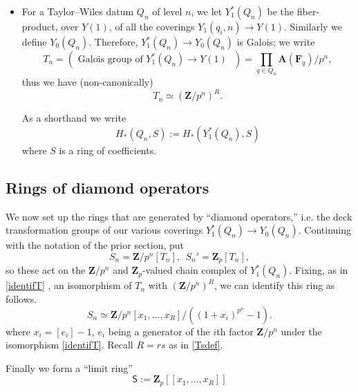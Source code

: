 \documentclass[10pt]{amsart}
\newcommand{\Z}{\mathbf{Z}}
\newcommand{\Sinf}{\mathsf{S}}
\theoremstyle{remark}
\begin{document}
\begin{itemize}
%

\item[-] For a Taylor--Wiles  datum $Q_n$ of level $n$, we  let    
 $Y_1^*(Q_n)$ be the fiber-product, over $Y(1)$, of all the coverings $Y_1(q_i,n) \rightarrow Y(1)$. 
 Similarly we define $Y_0(Q_n)$.  
Therefore, $Y_1^*(Q_n) \rightarrow Y_0(Q_n)$ is Galois;  
we write 
\begin{equation} \label{idontcare} T_n = \left(  \mbox{ Galois group of  $Y_1^*(Q_n) \rightarrow Y(1)$ }  \right) = \prod_{q \in Q_n} \mathbf{A}(\mathbf{F}_q)/p^n,\end{equation}
thus we have (non-canonically) 
\begin{equation} \label{identifT} T_n   \simeq (\Z/p^n)^R.\end{equation}


   As a shorthand we write
$$H_*(Q_n, S) := H_*(Y_1^*(Q_n), S)$$
where $S$ is a ring of coefficients.   



 \end{itemize}
 

\subsection{Rings of diamond operators} \label{sec:diamond} 
We now set up the rings that are generated by ``diamond operators,'' i.e. the deck transformation groups of our various coverings $Y_1^*(Q_n) \rightarrow Y_0(Q_n)$. 
Continuing  with the notation of the prior section, put    
\begin{equation} \label{sndef} S_n  = \Z/p^n[T_n], \ \ S_n' =  \Z_p [T_n], \end{equation}
so these act on  the $\Z/p^n$ and $\Z_p$-valued chain complex of $Y_1^*(Q_n)$. 
Fixing, as in \eqref{identifT} , an isomorphism of $T_n$ with $(\Z/p^n)^R$, we can identify this ring as follows.
\begin{equation} \label{explicit} S_n \simeq    \Z/p^n[x_1, \dots, x_R]/( (1+x_i)^{p^n}-1). \end{equation} 
where $x_i = [e_i]- 1$, $e_i$ being a generator of the $i$th factor $\Z/p^n$ under the isomorphism \eqref{identifT}.   Recall $R=rs$ as in \eqref{Tsdef}. 


Finally we form  a ``limit ring''  \index{$\Sinf$} 
\begin{equation} \label{Sinfdef} \Sinf := \Z_p[[x_1, \dots, x_R]]\end{equation}
\end{document}
